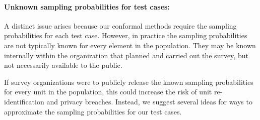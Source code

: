 \documentclass[10.5pt, letterpaper]{article}
\numberwithin{table}{section}
\numberwithin{figure}{section}
\numberwithin{equation}{section}
\begin{document}
%


\paragraph{Unknown sampling probabilities for test cases:} A distinct issue arises because our conformal methods require the sampling probabilities for each test case. However, in practice the sampling probabilities are not typically known for every element in the population. They may be known internally within the organization that planned and carried out the survey, but not necessarily available to the public.

If survey organizations were to publicly release the known sampling probabilities for every unit in the population, this could increase the risk of unit re-identification and privacy breaches.
Instead, we suggest several ideas for ways to approximate the sampling probabilities for our test cases.
\end{document}
